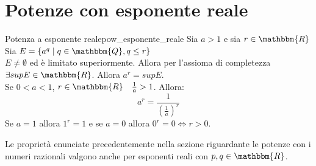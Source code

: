 \documentclass[12pt]{report}
\newcounter{definition}
\newcommand{\nmu}{}
\begin{document}
	\section{Potenze con esponente reale}
	\begin{definition}{\nmu Potenza a esponente reale}{pow_esponente_reale}
		Sia $a > 1$ e sia $r \in \mathbbm{R}$ \\
		Sia $E = \{a^q \mid q \in \mathbbm{Q}, q \leq r\}$ \\
		$E \neq \emptyset$ ed è limitato superiormente. Allora per l'assioma di completezza $\exists supE \in \mathbbm{R}$. Allora $a^r = supE$. \\
		Se $0 < a < 1$, $r \in \mathbbm{R} \quad \frac{1}{a} > 1$. Allora:
		\[
		a^r = \dfrac{1}{(\frac{1}{a})^r}
		\]
		Se $a = 1$ allora $1^r = 1$ e se $a=0$ allora $0^r = 0\iff r > 0$.
	\end{definition}
	Le proprietà enunciate precedentemente nella sezione riguardante le potenze con i numeri razionali valgono anche per esponenti reali con $p, q \in \mathbbm{R}$.
\end{document}
